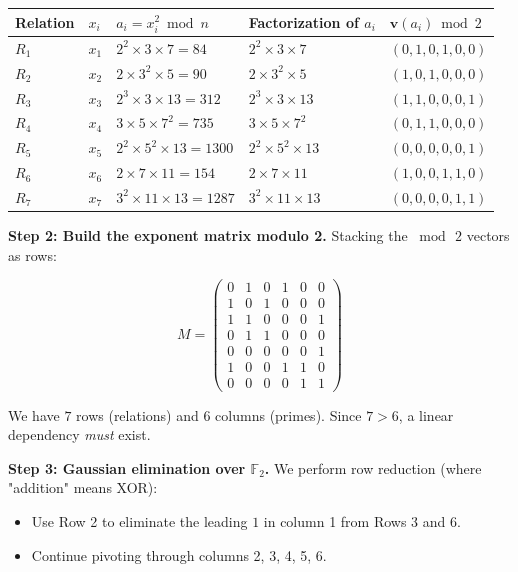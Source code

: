 \begin{center}
\small
\begin{tabular}{lllll}
\toprule
Relation & $x_i$ & $a_i = x_i^2 \bmod n$ & Factorization of $a_i$ & $\mathbf{v}(a_i) \bmod 2$ \\
\midrule
$R_1$ & $x_1$ & $2^2 \times 3 \times 7 = 84$ & $2^2 \times 3 \times 7$ & $(0, 1, 0, 1, 0, 0)$ \\
$R_2$ & $x_2$ & $2 \times 3^2 \times 5 = 90$ & $2 \times 3^2 \times 5$ & $(1, 0, 1, 0, 0, 0)$ \\
$R_3$ & $x_3$ & $2^3 \times 3 \times 13 = 312$ & $2^3 \times 3 \times 13$ & $(1, 1, 0, 0, 0, 1)$ \\
$R_4$ & $x_4$ & $3 \times 5 \times 7^2 = 735$ & $3 \times 5 \times 7^2$ & $(0, 1, 1, 0, 0, 0)$ \\
$R_5$ & $x_5$ & $2^2 \times 5^2 \times 13 = 1300$ & $2^2 \times 5^2 \times 13$ & $(0, 0, 0, 0, 0, 1)$ \\
$R_6$ & $x_6$ & $2 \times 7 \times 11 = 154$ & $2 \times 7 \times 11$ & $(1, 0, 0, 1, 1, 0)$ \\
$R_7$ & $x_7$ & $3^2 \times 11 \times 13 = 1287$ & $3^2 \times 11 \times 13$ & $(0, 0, 0, 0, 1, 1)$ \\
\bottomrule
\end{tabular}
\end{center}


\textbf{Step 2: Build the exponent matrix modulo 2.} Stacking the $\bmod\, 2$ vectors as rows:

\[
M = \begin{pmatrix} 0 & 1 & 0 & 1 & 0 & 0 \\ 1 & 0 & 1 & 0 & 0 & 0 \\ 1 & 1 & 0 & 0 & 0 & 1 \\ 0 & 1 & 1 & 0 & 0 & 0 \\ 0 & 0 & 0 & 0 & 0 & 1 \\ 1 & 0 & 0 & 1 & 1 & 0 \\ 0 & 0 & 0 & 0 & 1 & 1 \end{pmatrix}
\]

We have $7$ rows (relations) and $6$ columns (primes). Since $7 > 6$, a linear dependency \textit{must} exist.

\textbf{Step 3: Gaussian elimination over $\mathbb{F}_2$.} We perform row reduction (where "addition" means XOR):

\begin{itemize}[leftmargin=*]
\item Use Row 2 to eliminate the leading $1$ in column 1 from Rows 3 and 6.
\item Continue pivoting through columns 2, 3, 4, 5, 6.
\end{itemize}

